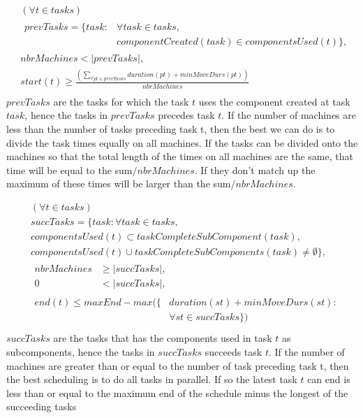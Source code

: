 \documentclass[10pt,a4paper]{report}
\begin{document}
\begin{equation}
\begin{aligned}\label{eq:71}
&(\forall t \in tasks) \\
&\begin{aligned}
prevTasks = \{task : &\forall task \in tasks,\\
&componentCreated(task) \in componentsUsed(t)\},
\end{aligned} \\
&nbrMachines < |prevTasks|,  \\
&start(t) \ge \frac{\left(\sum_{\forall pt \in prevTasks}duration(pt) + minMoveDurs(pt)\right)}{nbrMachines} \\
\end{aligned}
\end{equation}
$prevTasks$ are the tasks for which the task $t$ uses the component created at task $task$, hence the tasks in $prevTasks$ precedes task $t$. If the number of machines are less than the number of tasks preceding task t, then the best we can do is to divide the task times equally on all machines. If the tasks can be divided onto the machines so that the total length of the times on all machines are the same, that time will be equal to the sum$/nbrMachines$. If they don't match up the maximum of these times will be larger than the sum$/nbrMachines$.

\begin{equation}\label{eq:72}
\begin{aligned}
&(\forall t \in tasks) \\
&succTasks = \{task : \forall task \in tasks,\\
&componentsUsed(t) \subset taskCompleteSubComponent(task), \\
&componentsUsed(t) \cup taskCompleteSubComponents(task) \neq \emptyset\}, \\
&\begin{aligned}
nbrMachines &\ge |succTasks|,\\
0 &< |succTasks|,
\end{aligned}\\
&\begin{aligned}
end(t) \le maxEnd - max(\{&duration(st) + minMoveDurs(st) :\\
&\forall st \in succTasks\})
\end{aligned}\\
\end{aligned}
\end{equation}
$succTasks$ are the tasks that has the components used in task $t$ as subcomponents, hence the tasks in $succTasks$ succeeds task $t$. If the number of machines are greater than or equal to the number of task preceding task t, then the best scheduling is to do all tasks in parallel. If so the latest task $t$ can end is less than or equal to the maximum end of the schedule minus the longest of the succeeding tasks
\end{document}
